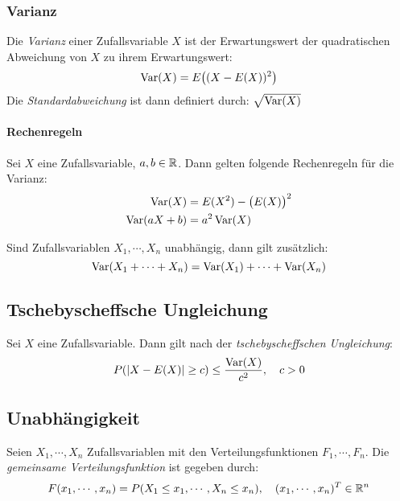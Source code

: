             \subsubsection{Varianz}
                Die \textit{Varianz} einer Zufallsvariable \(X\) ist der Erwartungswert der quadratischen Abweichung von \(X\) zu ihrem Erwartungswert:
                \begin{equation*}
                    \operatorname{Var}(X) = E\big( (X - E(X)) ^ 2 \big)
                \end{equation*}
                Die \textit{Standardabweichung} ist dann definiert durch: \( \sqrt{\operatorname{Var}(X)} \)

                \paragraph{Rechenregeln}
                    Sei \(X\) eine Zufallsvariable, \( a, b \in \mathbb{R} \). Dann gelten folgende Rechenregeln für die Varianz:
                    \begin{align*}
                        \operatorname{Var}(X) & = E(X^2) - \big(E(X)\big)^2 \\
                        \operatorname{Var}(aX + b) & = a^2 \operatorname{Var}(X)
                    \end{align*}
                    
                    Sind Zufallsvariablen \( X_1, \cdots, X_n \) unabhängig, dann gilt zusätzlich:
                    \begin{equation*}
	                    \operatorname{Var}(X_1 + \cdots + X_n) = \operatorname{Var}(X_1) + \cdots + \operatorname{Var}(X_n)
                    \end{equation*}

        \subsection{Tschebyscheffsche Ungleichung}
            Sei \( X \) eine Zufallsvariable. Dann gilt nach der \textit{tschebyscheffschen Ungleichung}:
            \begin{equation*}
                P(\abs{X - E(X)} \geq c) \leq \frac{\operatorname{Var}(X)}{c^2}, \quad c > 0
            \end{equation*}

        \subsection{Unabhängigkeit}
            Seien \( X_1, \cdots, X_n \) Zufallsvariablen mit den Verteilungsfunktionen \( F_1, \cdots, F_n \). Die \textit{gemeinsame Verteilungsfunktion} ist gegeben durch:
            \begin{equation*}
                F(x_1, \cdots, x_n) = P(X_1 \leq x_1, \cdots, X_n \leq x_n), \quad (x_1, \cdots, x_n)^T \in \mathbb{R}^n
            \end{equation*}
            
